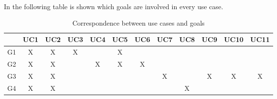 \documentclass[a4paper]{report}
\begin{document}
In the following table is shown which goals are involved in every use case.
\begin{table}[H]
  \centering
  \begin{tabular}{|c|c|c|c|c|c|c|c|c|c|c|c|}
    \cline{2-12}
    \multicolumn{1}{c|}{} & UC1 & UC2 & UC3 & UC4 & UC5 & UC6 & UC7 & UC8 & UC9 & UC10 & UC11 \\ \hline
    G1 & X & X & X &  & X &  &  &  &  &  &  \\ \hline
    G2 & X & X &  & X & X & X &  &  &  &  &  \\ \hline
    G3 & X & X &  &  &  &  & X &  & X & X & X \\ \hline
    G4 & X & X &  &  &  &  &  & X &  &  &  \\ \hline
  \end{tabular}
  \caption{Correspondence between use cases and goals}
\end{table}
\end{document}
